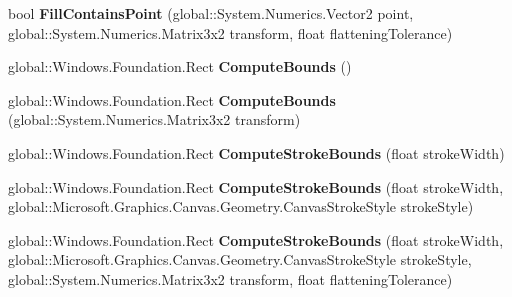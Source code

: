 \begin{DoxyCompactItemize}
bool {\bfseries Fill\+Contains\+Point} (global\+::\+System.\+Numerics.\+Vector2 point, global\+::\+System.\+Numerics.\+Matrix3x2 transform, float flattening\+Tolerance)
\item 
\mbox{\label{interface_microsoft_1_1_graphics_1_1_canvas_1_1_geometry_1_1_i_canvas_geometry_a6c649b42af2ad0758018d7c80627f36d}} 
global\+::\+Windows.\+Foundation.\+Rect {\bfseries Compute\+Bounds} ()
\item 
\mbox{\label{interface_microsoft_1_1_graphics_1_1_canvas_1_1_geometry_1_1_i_canvas_geometry_a95cc7e7112718afb642f295a64915386}} 
global\+::\+Windows.\+Foundation.\+Rect {\bfseries Compute\+Bounds} (global\+::\+System.\+Numerics.\+Matrix3x2 transform)
\item 
\mbox{\label{interface_microsoft_1_1_graphics_1_1_canvas_1_1_geometry_1_1_i_canvas_geometry_a85348d384cde919169814908c2636f61}} 
global\+::\+Windows.\+Foundation.\+Rect {\bfseries Compute\+Stroke\+Bounds} (float stroke\+Width)
\item 
\mbox{\label{interface_microsoft_1_1_graphics_1_1_canvas_1_1_geometry_1_1_i_canvas_geometry_a9a080ab4d42be333c23db1f84a78c37b}} 
global\+::\+Windows.\+Foundation.\+Rect {\bfseries Compute\+Stroke\+Bounds} (float stroke\+Width, global\+::\+Microsoft.\+Graphics.\+Canvas.\+Geometry.\+Canvas\+Stroke\+Style stroke\+Style)
\item 
\mbox{\label{interface_microsoft_1_1_graphics_1_1_canvas_1_1_geometry_1_1_i_canvas_geometry_a79b506c76a36146c8bcf102953a9e348}} 
global\+::\+Windows.\+Foundation.\+Rect {\bfseries Compute\+Stroke\+Bounds} (float stroke\+Width, global\+::\+Microsoft.\+Graphics.\+Canvas.\+Geometry.\+Canvas\+Stroke\+Style stroke\+Style, global\+::\+System.\+Numerics.\+Matrix3x2 transform, float flattening\+Tolerance)
\item 
\mbox{\label{interface_microsoft_1_1_graphics_1_1_canvas_1_1_geometry_1_1_i_canvas_geometry_acdb5842e23cf49f65d75966833fcdeda}} 

\end{DoxyCompactItemize}
